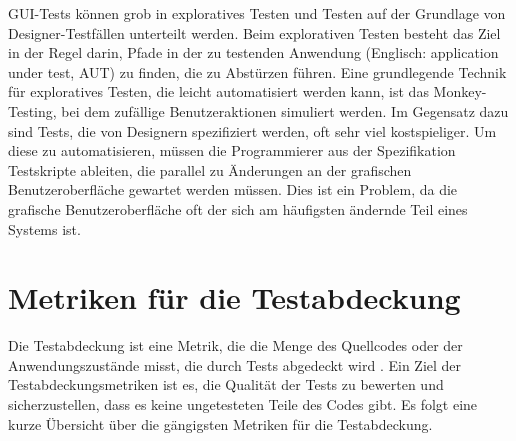 GUI-Tests können grob in exploratives Testen und Testen auf der Grundlage von Designer-Testfällen unterteilt werden.
Beim explorativen Testen besteht das Ziel in der Regel darin, Pfade in der zu testenden Anwendung (Englisch: application under test, AUT) zu finden, die zu Abstürzen führen.
Eine grundlegende Technik für exploratives Testen, die leicht automatisiert werden kann, ist das Monkey-Testing, bei dem zufällige Benutzeraktionen simuliert werden.
Im Gegensatz dazu sind Tests, die von Designern spezifiziert werden, oft sehr viel kostspieliger.
Um diese zu automatisieren, müssen die Programmierer aus der Spezifikation Testskripte ableiten, die parallel zu Änderungen an der grafischen Benutzeroberfläche gewartet werden müssen.
Dies ist ein Problem, da die grafische Benutzeroberfläche oft der sich am häufigsten ändernde Teil eines Systems ist.

\section{Metriken für die Testabdeckung}
\label{sec:Foundations:TestCoverageMetrics}

Die Testabdeckung ist eine Metrik, die die Menge des Quellcodes oder der Anwendungszustände misst, die durch Tests abgedeckt wird \cite{Sommerville10}.
Ein Ziel der Testabdeckungsmetriken ist es, die Qualität der Tests zu bewerten  und sicherzustellen, dass es keine ungetesteten Teile des Codes gibt.
Es folgt eine kurze Übersicht über die gängigsten Metriken für die Testabdeckung.

